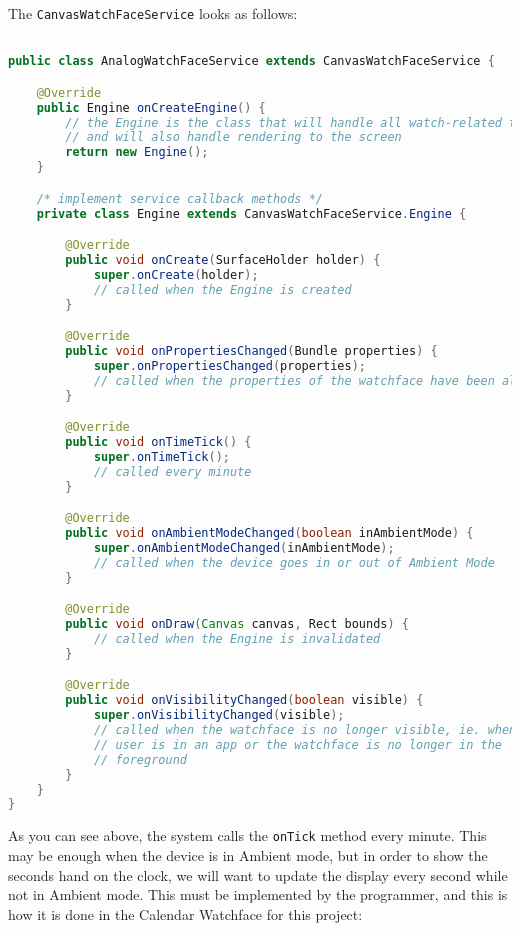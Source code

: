 The \texttt{CanvasWatchFaceService} looks as follows:
\begin{lstlisting}[language=Java]

public class AnalogWatchFaceService extends CanvasWatchFaceService {

    @Override
    public Engine onCreateEngine() {
        // the Engine is the class that will handle all watch-related tasks
        // and will also handle rendering to the screen
        return new Engine();
    }

    /* implement service callback methods */
    private class Engine extends CanvasWatchFaceService.Engine {

        @Override
        public void onCreate(SurfaceHolder holder) {
            super.onCreate(holder);
            // called when the Engine is created
        }

        @Override
        public void onPropertiesChanged(Bundle properties) {
            super.onPropertiesChanged(properties);
            // called when the properties of the watchface have been altered
        }

        @Override
        public void onTimeTick() {
            super.onTimeTick();
            // called every minute
        }

        @Override
        public void onAmbientModeChanged(boolean inAmbientMode) {
            super.onAmbientModeChanged(inAmbientMode);
            // called when the device goes in or out of Ambient Mode
        }

        @Override
        public void onDraw(Canvas canvas, Rect bounds) {
            // called when the Engine is invalidated
        }

        @Override
        public void onVisibilityChanged(boolean visible) {
            super.onVisibilityChanged(visible);
            // called when the watchface is no longer visible, ie. when the
            // user is in an app or the watchface is no longer in the
            // foreground
        }
    }
}

\end{lstlisting}

As you can see above, the system calls the \texttt{onTick} method every minute.
This may be enough when the device is in Ambient mode, but in order to show the
seconds hand on the clock, we will want to update the display every second while
not in Ambient mode. This must be implemented by the programmer, and this is how
it is done in the Calendar Watchface for this project:

